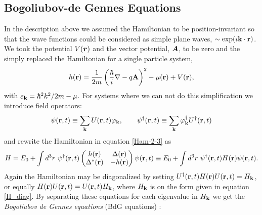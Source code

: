 \subsection{Bogoliubov-de Gennes Equations}
In the description above we assumed the Hamiltonian to be position-invariant so that the wave functions could be considered as simple plane waves, $\sim \exp(i\mathbf{k}\cdot\mathbf{r}) $. We took the potential $V(\boldsymbol{r})$ and the vector potential, $\boldsymbol{A}$, to be zero and the simply replaced the Hamiltonian for a single particle system, 
\begin{equation}
    h(\mathbf{r}) = \frac{1}{2m}\left(\frac{\hbar}{i}\nabla - q\mathbf{A}\right)^2 -\mu(\mathbf{r}) + V(\mathbf{r}),
\label{Ham-2-4}
\end{equation}
with $\varepsilon_{\mathbf{k}} = \hbar^2k^2/2m - \mu$. For systems where we can not do this simplification we introduce field operators:
\begin{equation}
    \psi(\mathbf{r},t) \equiv \sum_{\mathbf{k}}U(\mathbf{r},t)\varphi_{\mathbf{k}}, \qquad \psi^{\dagger}(\mathbf{r},t) \equiv \sum_{\mathbf{k}}\varphi_{\mathbf{k}}^{\dagger}U^{\dagger}(\mathbf{r},t) 
\end{equation}
and rewrite the Hamiltonian in equation \eqref{Ham-2-3} as
\begin{equation}
    H = E_0 + \int d^3r \ \psi^{\dagger}(\rbf,t)
    \begin{pmatrix}
        h(\rbf) & \Delta(\rbf) \\
        \Delta^*(\rbf) & -h(\rbf)
    \end{pmatrix}
    \psi(\rbf,t)
    \equiv E_0 + \int d^3r \ \psi^{\dagger}(\rbf,t) H(\rbf) \psi(\rbf,t).
\end{equation}
Again the Hamiltonian may be diagonalized by setting $U^{\dagger}(\mathbf{r},t)H(\mathbf{r})U(\mathbf{r},t) = H_{\mathbf{k}}$, or equally $H(\mathbf{r})U(\mathbf{r},t) = U(\mathbf{r},t)H_{\mathbf{k}}$, where $H_{\mathbf{k}}$ is on the form given in equation \eqref{H_diag}. By separating these equations for each eigenvalue in $H_{\mathbf{k}}$ we get the \textit{Bogoliubov de Gennes equations} (BdG equations) \cite{BdG}:
